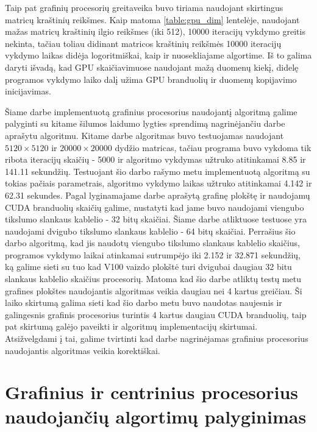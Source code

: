 \documentclass{VUMIFPSbakalaurinis}
\begin{document}
Taip pat grafinių procesorių greitaveika buvo tiriama naudojant skirtingus matricų kraštinių reikšmes.
Kaip matoma \ref{table:gpu_dim} lentelėje, naudojant mažas matricų kraštinių ilgio reikšmes (iki 512), 10000 iteracijų vykdymo greitis nekinta, tačiau toliau didinant matricos kraštinių reikšmės 10000 iteracijų vykdymo laikas didėja logoritmiškai, kaip ir nuosekliajame algortime.
Iš to galima daryti išvadą, kad GPU skaičiavimuose naudojant mažą duomenų kiekį, didelę programos vykdymo laiko dalį užima GPU branduolių ir duomenų kopijavimo inicijavimas. 

Šiame darbe implementuotą grafinius procesorius naudojantį algoritmą galime palyginti su kitame šilumos laidumo lygties sprendimą nagrinėjančiu darbe \cite{belhaous2021comparative} aprašytu algoritmu. 
Kitame darbe \cite{belhaous2021comparative} algoritmas buvo testuojamas naudojant $5120 \times 5120$ ir $20000 \times 20000$ dydžio matricas, tačiau programa buvo vykdoma tik ribota iteracijų skaičių - 5000 ir algoritmo vykdymas užtruko atitinkamai 8.85 ir  141.11 sekundžių.
Testuojant šio darbo rašymo metu implementuotą algoritmą su tokias pačiais parametrais, algoritmo vykdymo laikas užtruko atitinkamai 4.142 ir 62.31 sekundes.
Pagal lyginamajame darbe \cite{belhaous2021comparative} aprašytą grafinę plokštę ir naudojamų CUDA branduolių skaičių galime, nustatyti kad jame buvo naudojami viengubo tikslumo slankaus kablelio - 32 bitų  skaičiai.
Šiame darbe atliktuose testuose yra naudojami dvigubo tikslumo slankaus kablelio - 64 bitų skaičiai.
Perrašius šio darbo algoritmą, kad jis naudotų viengubo tikslumo slankaus kablelio skaičius, programos vykdymo laikai atinkamai sutrumpėjo iki 2.152 ir 32.871 sekundžių, ką galime sieti su tuo kad V100 vaizdo plokštė turi dvigubai daugiau 32 bitu slankaus kablelio skaičius procesorių.    
Matoma kad šio darbe atliktų testų metu grafines plokštes naudojantis algoritmas veikia daugiau nei 4 kartus greičiau.
Ši laiko skirtumą galima sieti kad šio darbo metu buvo naudotas naujesnis ir galingesnis grafinis procesorius turintis 4 kartus daugiau CUDA branduolių, taip pat skirtumą galėjo paveikti ir algoritmų implementacijų skirtumai.
Atsižvelgdami į tai, galime tvirtinti kad darbe nagrinėjamas grafinius procesorius naudojantis algoritmas veikia korektiškai.


\section{Grafinius ir centrinius procesorius naudojančių algortimų palyginimas}
\end{document}
